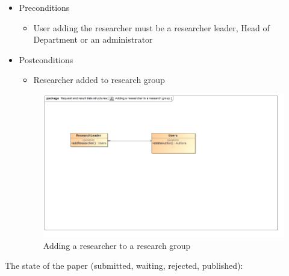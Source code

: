 \documentclass[a4paper,12pt]{article}
\begin{document}
\begin{itemize}
    \item Preconditions
    \begin{itemize}
        \item User adding the researcher must be a researcher leader, Head of Department or an administrator
    \end{itemize}
    \item Postconditions
    \begin{itemize}
        \item Researcher added to research group
    \end{itemize}
    
    \begin{figure}[H]
    \centering
    \caption{Adding a researcher to a research group}
    \includegraphics[width=1\textwidth]{use-case/adding-a-researcher-to-a-research-group.png}
    \end{figure}
\end{itemize}
The state of the paper (submitted, waiting, rejected, published):
\end{document}
